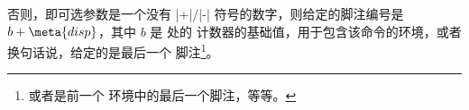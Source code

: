 % 



否则，即可选参数是一个没有 |+|/|-| 符号的数字，则给定的脚注编号是 $b+\meta{disp}$，其中 $b$ 是 \beginparacol{} 处的  计数器的基础值，用于包含该命令的环境，或者换句话说，给定的是最后一个 \Preenv{} 脚注\footnote{或者是前一个  环境中的最后一个脚注，等等。\label{fn:4L0}}。
% 


